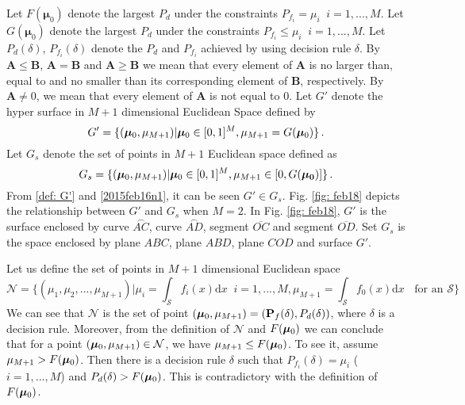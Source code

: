 Let $F(\boldsymbol{\mu}_0)$ denote the largest $P_d$ under the constraints $P_{f_i} = \mu_i\;\;i = 1, ..., M$.
Let $G(\boldsymbol{\mu}_0)$ denote the largest $P_d$ under the constraints $P_{f_i} \leq \mu_i\;\;i = 1, ..., M$.
Let $P_d(\delta)$, $P_{f_i}(\delta)$ denote the $P_d$ and $P_{f_i}$ achieved by using decision rule $\delta$.
By $\mathbf{A} \leq \mathbf{B}$, $\mathbf{A} = \mathbf{B}$ and  $\mathbf{A} \geq \mathbf{B}$ we mean that every element of $\mathbf{A}$ is no larger than, equal to and no smaller than its corresponding element of $\mathbf{B}$, respectively. 
By $\mathbf{A} \neq 0$, we mean that every element of $\mathbf{A}$ is not equal to $0$. 
Let $G'$ denote the hyper surface in $M+1$ dimensional Euclidean Space defined by 
\begin{equation}
 \label{def: G'}
 G' = \{(\boldsymbol{\mu}_0, \mu_{M+1})  | \boldsymbol{\mu}_0 \in [0, 1]^M, \mu_{M+1}= G(\boldsymbol{\mu}_0) \}\,.
\end{equation}
Let $G_s$ denote the set of points in $M+1$ Euclidean space defined as 
\begin{equation}
  \label{2015feb16n1}
G_s =  \{(\boldsymbol{\mu}_0, \mu_{M+1}) | \boldsymbol{\mu}_0\in [0, 1]^M, \mu_{M+1} \in [0, G(\mathbf{\boldsymbol{\mu}_0})]
    \}\,.
  \end{equation}
  From \eqref{def: G'} and \eqref{2015feb16n1}, it can be seen $G' \in G_s$. Fig. \ref{fig: feb18} depicts the relationship between $G'$ and $G_s$ when $M=2$. In Fig. \ref{fig: feb18}, $G'$ is the surface enclosed by curve $\stackrel\frown{AC}$, curve $\stackrel\frown{AD}$, segment $\overline{OC}$ and segment $\overline{OD}$. Set $G_s$ is the space enclosed by plane $ABC$, plane $ABD$, plane $COD$ and surface $G'$.  

Let us define the set of points in $M+1$ dimensional Euclidean space
\begin{equation}
  \mathcal{N} = \{(\mu_1, \mu_2, ..., \mu_{M+1}) | \mu_i = \int_{\mathcal{S}}f_i(x)\mathrm{d}x \;\;i=1, ..., M, \mu_{M+1}=\int_{\mathcal{S}}f_{0}(x)\mathrm{d}x \;\;\text{ for an $\mathcal{S}$}\}
\end{equation}
We can see that $\mathcal{N}$ is the set of point $(\boldsymbol{\mu}_0, \mu_{M+1})=(\mathbf{P}_f(\delta), P_d(\delta))$, where $\delta$ is a decision rule. Moreover, from the definition of $\mathcal{N}$ and $F(\boldsymbol{\mu}_0)$ we can conclude that for a point $(\boldsymbol{\mu}_0, \mu_{M+1}) \in \mathcal{N}$, we have $\mu_{M+1} \leq F(\boldsymbol{\mu}_0)$. 
To see it, assume $\mu_{M+1} > F(\boldsymbol{\mu}_0)$. Then there is a decision rule $\delta$ such that $P_{f_i}(\delta) = \mu_i$ ($i=1, ..., M$) and $P_d(\delta) > F(\boldsymbol{\mu}_0)$. This is contradictory with the definition of $F(\boldsymbol{\mu}_0)$. 

